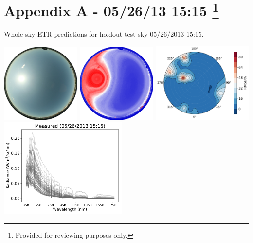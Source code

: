 \section*{Appendix A - 05/26/13 15:15 \footnote{Provided for reviewing purposes only.}}

\noindent
Whole sky ETR predictions for holdout test sky {05/26/2013 15:15}.\\%

\begin{center}
\includegraphics[width=0.30\textwidth]{img/05261515.jpg}
\includegraphics[width=0.30\textwidth]{img/05261515_sradmap.png}
\includegraphics[width=0.38\textwidth]{img/05261515_wholesky_full.pdf}\\
\vspace{0.26in}%
\includegraphics[width=0.48\textwidth]{img/05261515_measured.pdf}

\end{center}
